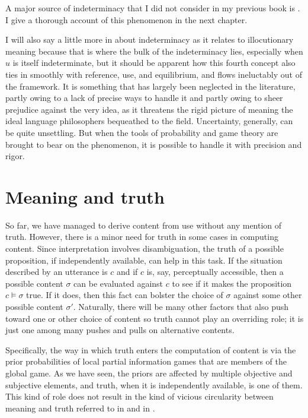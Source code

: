 A major source of indeterminacy that I did not consider in my previous book is . I give a thorough account of this phenomenon in the next chapter.

I will also say a little more in  about indeterminacy as it relates to illocutionary meaning because that is where the bulk of the indeterminacy lies, especially when $u$ is itself indeterminate, but it should be apparent how this fourth concept also ties in smoothly with reference, use, and equilibrium, and flows ineluctably out of the framework. It is something that has largely been neglected in the literature, partly owing to a lack of precise ways to handle it and partly owing to sheer prejudice against the very idea, as it threatens the rigid picture of meaning the ideal language philosophers bequeathed to the field. Uncertainty, generally, can be quite unsettling. But when the tools of probability and game theory are brought to bear on the phenomenon, it is possible to handle it with precision and rigor.


\section{Meaning and truth} \label{sec:meaning and truth}
So far, we have managed to derive content from use without any mention of truth. However, there is a minor need for truth in some cases in computing content. Since interpretation involves disambiguation, the truth of a possible proposition, if independently available, can help in this task. If the situation described by an utterance is $c$ and if $c$ is, say, perceptually accessible, then a possible content $\sigma$ can be evaluated against $c$ to see if it makes the proposition $c \vDash \sigma$ true. If it does, then this fact can bolster the choice of $\sigma$ against some other possible content $\sigma'$. Naturally, there will be many other factors that also push toward one or other choice of content so truth cannot play an overriding role; it is just one among many pushes and pulls on alternative contents.

Specifically, the way in which truth enters the computation of content is via the prior probabilities of local partial information games that are members of the global game. As we have seen, the priors are affected by multiple objective and subjective elements, and truth, when it is independently available, is one of them. This kind of role does not result in the kind of vicious circularity between meaning and truth referred to in \citet{dummett:oap} and in .

